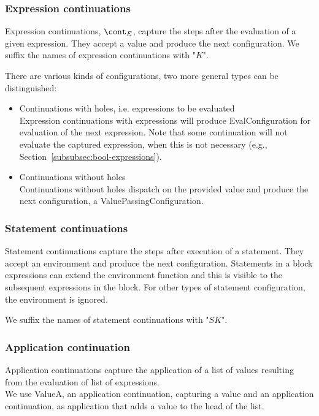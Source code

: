 \documentclass{article}
\begin{document}
\subsubsection{Expression continuations}
\label{subsubsec:expression-continuations}

Expression continuations, $\econt$, capture the steps after the evaluation of a given expression. They accept a value and produce the next configuration. We suffix the names of expression continuations with "$K$".

There are various kinds of configurations, two more general types can be distinguished:
\begin{itemize}
\item Continuations with holes, i.e. expressions to be evaluated\\
Expression continuations with expressions will produce EvalConfiguration for evaluation of the next expression.
Note that some continuation will not evaluate the captured expression, when this is not necessary (e.g., Section~\ref{subsubsec:bool-expressions}).

\item Continuations without holes\\
Continuations without holes dispatch on the provided value and produce the next configuration, a ValuePassingConfiguration.
\end{itemize}

\subsubsection{Statement continuations}
\label{subsubsec:statement-continuations}

Statement continuations capture the steps after execution of a statement. They accept an environment and produce the next configuration. Statements in a block expressions can extend the environment function and this is visible to the subsequent expressions in the block. For other types of statement configuration, the environment is ignored.

\noindent
We suffix the names of statement continuations with "$SK$".

\subsubsection{Application continuation}
\label{subsubsec:application-continuation}

Application continuations capture the application of a list of values resulting from the evaluation of list of expressions.\\
We use ValueA, an application continuation, capturing a value and an application continuation, as application that adds a value to the head of the list.
\end{document}

